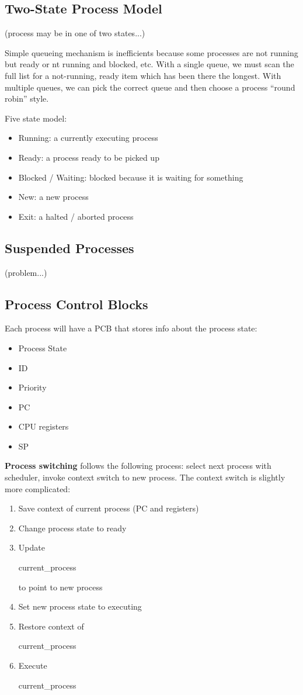 \documentclass[12pt]{article}
\begin{document}
\subsection{Two-State Process Model}
(process may be in one of two states...)

Simple queueing mechanism is inefficients because some processes are not running but ready or nt running and blocked, etc. With a single queue, we must scan the full list for a not-running, ready item which has been there the longest. With multiple queues, we can pick the correct queue and then choose a process ``round robin'' style.

Five state model:
\begin{itemize}
\item Running: a currently executing process
\item Ready: a process ready to be picked up
\item Blocked / Waiting: blocked because it is waiting for something
\item New: a new process
\item Exit: a halted / aborted process
\end{itemize}

\subsection{Suspended Processes}
(problem...)

\subsection{Process Control Blocks}
Each process will have a PCB that stores info about the process state:
\begin{itemize}
\item Process State
\item ID
\item Priority
\item PC
\item CPU registers
\item SP
\end{itemize}

{\bf Process switching} follows the following process: select next process with scheduler, invoke context switch to new process. The context switch is slightly more complicated:
\begin{enumerate}
\item Save context of current process (PC and registers)
\item Change process state to ready
\item Update \begin{code}current\_process\end{code} to point to new process
\item Set new process state to executing
\item Restore context of \begin{code}current\_process\end{code}
\item Execute \begin{code}current\_process\end{code}
\end{enumerate}
\end{document}
